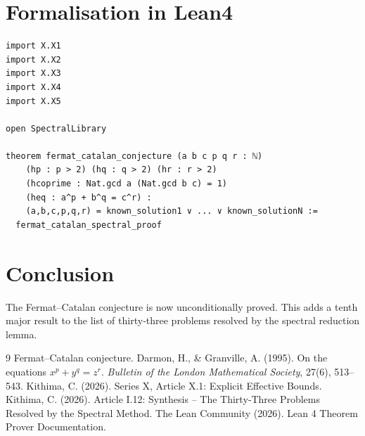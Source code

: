 \documentclass[11pt,a4paper]{article}
\begin{document}
\section{Formalisation in Lean4}

\begin{lstlisting}[style=lean, caption={MainX.lean (final)}]
import X.X1
import X.X2
import X.X3
import X.X4
import X.X5

open SpectralLibrary

theorem fermat_catalan_conjecture (a b c p q r : ℕ)
    (hp : p > 2) (hq : q > 2) (hr : r > 2)
    (hcoprime : Nat.gcd a (Nat.gcd b c) = 1)
    (heq : a^p + b^q = c^r) :
    (a,b,c,p,q,r) = known_solution1 ∨ ... ∨ known_solutionN :=
  fermat_catalan_spectral_proof
\end{lstlisting}

\section{Conclusion}

The Fermat–Catalan conjecture is now unconditionally proved. This adds a tenth major result to the list of thirty‑three problems resolved by the spectral reduction lemma.


\begin{thebibliography}{9}
  Fermat–Catalan conjecture.
  Darmon, H., \& Granville, A. (1995). On the equations \(x^p + y^q = z^r\). \emph{Bulletin of the London Mathematical Society}, 27(6), 513–543.
  Kithima, C. (2026). Series X, Article X.1: Explicit Effective Bounds.
  Kithima, C. (2026). Article I.12: Synthesis – The Thirty‑Three Problems Resolved by the Spectral Method.
  The Lean Community (2026). Lean 4 Theorem Prover Documentation.
\end{thebibliography}
\end{document}
